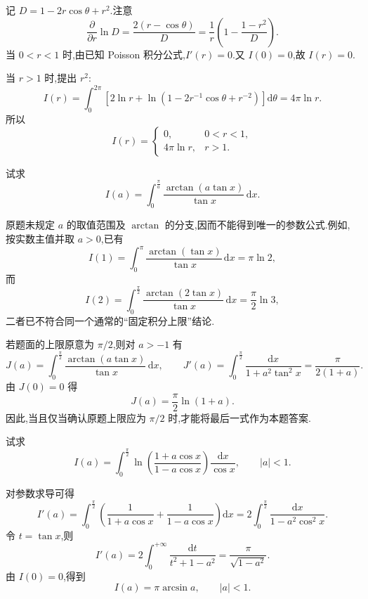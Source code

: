 \begin{solution}
    记 $D=1-2r\cos\theta+r^2$.注意
    \[
        \dfrac{\partial}{\partial r}\ln D
        =\dfrac{2(r-\cos\theta)}{D}
        =\dfrac{1}{r}\left(1-\dfrac{1-r^2}{D}\right).
    \]
    当 $0<r<1$ 时,由已知 Poisson 积分公式,$I'(r)=0$.又 $I(0)=0$,故 $I(r)=0$.

    当 $r>1$ 时,提出 $r^2$:
    \[
        I(r)=\int_0^{2\pi}\left[2\ln r+\ln\left(1-2r^{-1}\cos\theta+r^{-2}\right)\right]\mathrm{d}\theta
        =4\pi\ln r.
    \]
    所以
    \[
        I(r)=
        \begin{cases}
            0,         & 0<r<1, \\
            4\pi\ln r, & r>1.
        \end{cases}
    \]
\end{solution}

\begin{example}
    试求
    \[
        I(a)=\int_0^{\frac{\pi}{a}}\dfrac{\arctan(a\tan x)}{\tan x}\,\mathrm{d}x.
    \]
\end{example}
\exampleblank

\begin{solution}
    原题未规定 $a$ 的取值范围及 $\arctan$ 的分支,因而不能得到唯一的参数公式.例如,按实数主值并取 $a>0$,已有
    \[
        I(1)=\int_0^\pi\dfrac{\arctan(\tan x)}{\tan x}\,\mathrm{d}x
        =\pi\ln2,
    \]
    而
    \[
        I(2)=\int_0^{\frac{\pi}{2}}\dfrac{\arctan(2\tan x)}{\tan x}\,\mathrm{d}x
        =\dfrac{\pi}{2}\ln3,
    \]
    二者已不符合同一个通常的``固定积分上限''结论.

    若题面的上限原意为 $\pi/2$,则对 $a>-1$ 有
    \[
        J(a)=\int_0^{\frac{\pi}{2}}\dfrac{\arctan(a\tan x)}{\tan x}\,\mathrm{d}x,
        \qquad
        J'(a)=\int_0^{\frac{\pi}{2}}\dfrac{\mathrm{d}x}{1+a^2\tan^2x}
        =\dfrac{\pi}{2(1+a)}.
    \]
    由 $J(0)=0$ 得
    \[
        J(a)=\dfrac{\pi}{2}\ln(1+a).
    \]
    因此,当且仅当确认原题上限应为 $\pi/2$ 时,才能将最后一式作为本题答案.
\end{solution}

\begin{example}
    试求
    \[
        I(a)=\int_0^{\frac{\pi}{2}}\ln\left(\dfrac{1+a\cos x}{1-a\cos x}\right)\dfrac{\mathrm{d}x}{\cos x},
        \qquad |a|<1.
    \]
\end{example}
\exampleblank

\begin{solution}
    对参数求导可得
    \[
        I'(a)=\int_0^{\frac{\pi}{2}}
        \left(\dfrac{1}{1+a\cos x}+\dfrac{1}{1-a\cos x}\right)\mathrm{d}x
        =2\int_0^{\frac{\pi}{2}}\dfrac{\mathrm{d}x}{1-a^2\cos^2x}.
    \]
    令 $t=\tan x$,则
    \[
        I'(a)=2\int_0^{+\infty}\dfrac{\mathrm{d}t}{t^2+1-a^2}
        =\dfrac{\pi}{\sqrt{1-a^2}}.
    \]
    由 $I(0)=0$,得到
    \[
        I(a)=\pi\arcsin a,
        \qquad |a|<1.
    \]
\end{solution}


